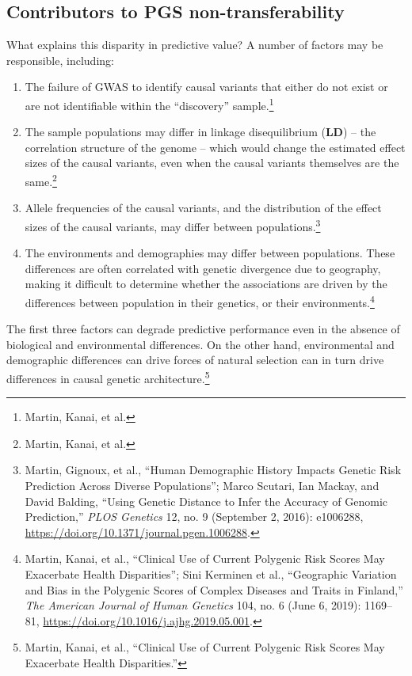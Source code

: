 \documentclass[
]{book}
\begin{document}
\hypertarget{contributors-to-pgs-non-transferability}{%
\subsection{Contributors to PGS non-transferability}\label{contributors-to-pgs-non-transferability}}

What explains this disparity in predictive value? A number of factors may be responsible, including:

\begin{enumerate}
\def\labelenumi{\arabic{enumi}.}
\item
  The failure of GWAS to identify causal variants that either do not exist or are not identifiable within the ``discovery'' sample.\footnote{Martin, Kanai, et al.}
\item
  The sample populations may differ in linkage disequilibrium (\textbf{LD}) -- the correlation structure of the genome -- which would change the estimated effect sizes of the causal variants, even when the causal variants themselves are the same.\footnote{Martin, Kanai, et al.}
\item
  Allele frequencies of the causal variants, and the distribution of the effect sizes of the causal variants, may differ between populations.\footnote{Martin, Gignoux, et al., {``Human Demographic History Impacts Genetic Risk Prediction Across Diverse Populations''}; Marco Scutari, Ian Mackay, and David Balding, {``Using {Genetic Distance} to {Infer} the {Accuracy} of {Genomic Prediction},''} \emph{PLOS Genetics} 12, no. 9 (September 2, 2016): e1006288, \url{https://doi.org/10.1371/journal.pgen.1006288}.}
\item
  The environments and demographies may differ between populations. These differences are often correlated with genetic divergence due to geography, making it difficult to determine whether the associations are driven by the differences between population in their genetics, or their environments.\footnote{Martin, Kanai, et al., {``Clinical Use of Current Polygenic Risk Scores May Exacerbate Health Disparities''}; Sini Kerminen et al., {``Geographic {Variation} and {Bias} in the {Polygenic Scores} of {Complex Diseases} and {Traits} in {Finland},''} \emph{The American Journal of Human Genetics} 104, no. 6 (June 6, 2019): 1169--81, \url{https://doi.org/10.1016/j.ajhg.2019.05.001}.}
\end{enumerate}

The first three factors can degrade predictive performance even in the absence of biological and environmental differences. On the other hand, environmental and demographic differences can drive forces of natural selection can in turn drive differences in causal genetic architecture.\footnote{Martin, Kanai, et al., {``Clinical Use of Current Polygenic Risk Scores May Exacerbate Health Disparities.''}}
\end{document}
